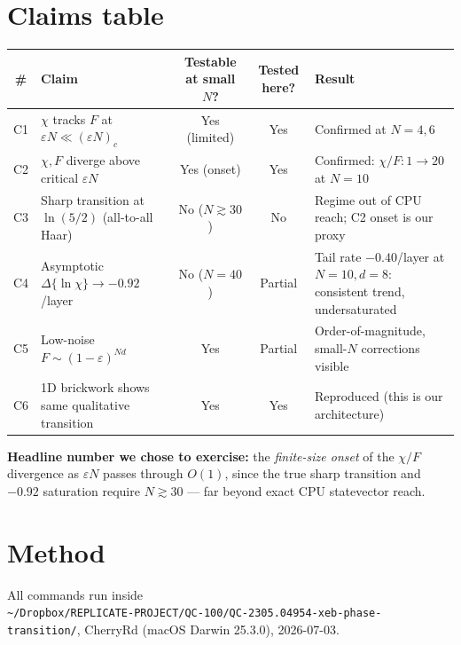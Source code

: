 \documentclass[11pt]{article}
\begin{document}
\section{Claims table}
\begin{longtable}{clccl}
\toprule
\# & Claim & Testable at small $N$? & Tested here? & Result \\
\midrule
C1 & $\chi$ tracks $F$ at $\varepsilon N \ll (\varepsilon N)_c$ & Yes (limited) & Yes & Confirmed at $N=4,6$ \\
C2 & $\chi,F$ diverge above critical $\varepsilon N$ & Yes (onset) & Yes & Confirmed: $\chi/F: 1{\to}20$ at $N=10$ \\
C3 & Sharp transition at $\ln(5/2)$ (all-to-all Haar) & No ($N\gtrsim 30$) & No & Regime out of CPU reach; C2 onset is our proxy \\
C4 & Asymptotic $\Delta\{\ln\chi\}\to -0.92$/layer & No ($N=40$) & Partial & Tail rate $-0.40$/layer at $N=10, d=8$: consistent trend, undersaturated \\
C5 & Low-noise $F\sim(1-\varepsilon)^{Nd}$ & Yes & Partial & Order-of-magnitude, small-$N$ corrections visible \\
C6 & 1D brickwork shows same qualitative transition & Yes & Yes & Reproduced (this is our architecture) \\
\bottomrule
\end{longtable}

\textbf{Headline number we chose to exercise:} the \emph{finite-size onset} of the $\chi/F$
divergence as $\varepsilon N$ passes through $O(1)$, since the true sharp transition and $-0.92$
saturation require $N\gtrsim 30$ --- far beyond exact CPU statevector reach.

\section{Method}
All commands run inside\\
\texttt{\~{}/Dropbox/REPLICATE-PROJECT/QC-100/QC-2305.04954-xeb-phase-transition/}, CherryRd
(macOS Darwin 25.3.0), 2026-07-03.
\end{document}
